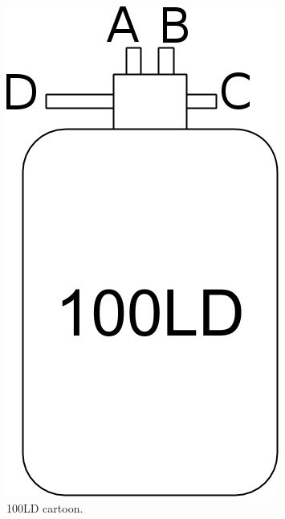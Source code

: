 \begin{figure}[!htbp]
\begin{minipage}{.40\textwidth}
 \includegraphics[width=\textwidth]{./img/100LD-cartoon.jpg}
 \caption{100LD cartoon.}
 \label{fig:100LD-cartoon}
 \end{minipage}
 \quad
\end{figure}



